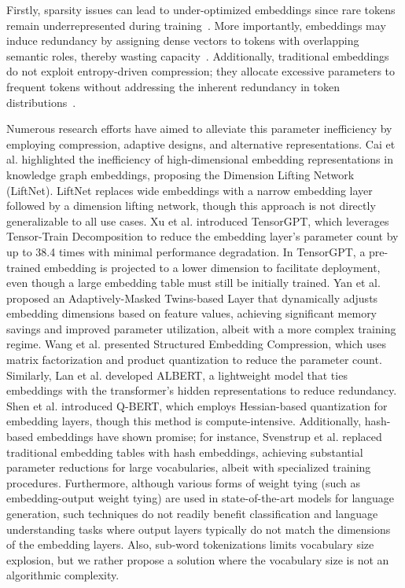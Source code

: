 \documentclass{article}
\begin{document}
Firstly, sparsity issues can lead to under-optimized embeddings since rare tokens remain underrepresented during training~\cite{svenstrup2017hash}. More importantly, embeddings may induce redundancy by assigning dense vectors to tokens with overlapping semantic roles, thereby wasting capacity~\cite{lan2019albert}. Additionally, traditional embeddings do not exploit entropy-driven compression; they allocate excessive parameters to frequent tokens without addressing the inherent redundancy in token distributions~\cite{shu2017compressing}.

Numerous research efforts have aimed to alleviate this parameter inefficiency by employing compression, adaptive designs, and alternative representations. Cai et al. \cite{cai2023dimensionlifting} highlighted the inefficiency of high-dimensional embedding representations in knowledge graph embeddings, proposing the Dimension Lifting Network (LiftNet). LiftNet replaces wide embeddings with a narrow embedding layer followed by a dimension lifting network, though this approach is not directly generalizable to all use cases. Xu et al. \cite{xu2023tensorgpt} introduced TensorGPT, which leverages Tensor-Train Decomposition to reduce the embedding layer's parameter count by up to 38.4 times with minimal performance degradation. In TensorGPT, a pre-trained embedding is projected to a lower dimension to facilitate deployment, even though a large embedding table must still be initially trained. Yan et al. \cite{yan2021adaptivemaskedtwins} proposed an Adaptively-Masked Twins-based Layer that dynamically adjusts embedding dimensions based on feature values, achieving significant memory savings and improved parameter utilization, albeit with a more complex training regime. Wang et al. \cite{wang2020structured} presented Structured Embedding Compression, which uses matrix factorization and product quantization to reduce the parameter count. Similarly, Lan et al. \cite{lan2019albert} developed ALBERT, a lightweight model that ties embeddings with the transformer's hidden representations to reduce redundancy. Shen et al. \cite{shen2020qbert} introduced Q-BERT, which employs Hessian-based quantization for embedding layers, though this method is compute-intensive. Additionally, hash-based embeddings have shown promise; for instance, Svenstrup et al. \cite{svenstrup2017hash} replaced traditional embedding tables with hash embeddings, achieving substantial parameter reductions for large vocabularies, albeit with specialized training procedures. Furthermore, although various forms of weight tying (such as embedding-output weight tying) are used in state-of-the-art models for language generation, such techniques do not readily benefit classification and language understanding tasks where output layers typically do not match the dimensions of the embedding layers. Also, sub-word tokenizations limits vocabulary size explosion, but we rather propose a solution where the vocabulary size is not an algorithmic complexity.
\end{document}
